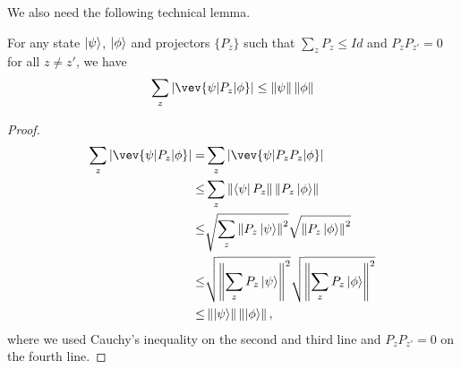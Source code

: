 We also need the following technical lemma.
\begin{lemma}\label{lem:samp-tech}
For any state $\ket{\psi}$,  $\ket{\phi}$ and projectors $\{P_z\}$ such that $\sum_z P_z \leq Id$ and $P_z P_{z'} =0 $ for all $z\neq z'$, we have
$$  \sum_z |\vev{\psi|P_z|\phi}| \leq \norm{\psi}\norm{\phi} $$
\end{lemma}
\begin{proof}
\begin{align}
    \sum_z |\vev{\psi|P_z|\phi}| =&\sum_z|\vev{\psi|P_zP_z|\phi}| \nn \\
    \leq& \sum_z \norm{\bra{\psi}P_z} \norm{ P_z\ket{\phi}}  \nn \\ \leq&  \sqrt{\sum_z \norm{P_z\ket{\psi}}^2} \sqrt{\norm{ P_z\ket{\phi}}^2}     \nn \\
    \leq& \sqrt{\norm{\sum_z P_z\ket{\psi}}^2 } \sqrt{\norm{\sum_z P_z\ket{\phi}}^2 } \nn \\
    \leq & \norm{\ket{\psi}}\norm{\ket{\phi}},
\end{align}
where we used Cauchy's inequality on the second and third line and $P_z P_{z'} =0 $ on the fourth line.
\end{proof}



